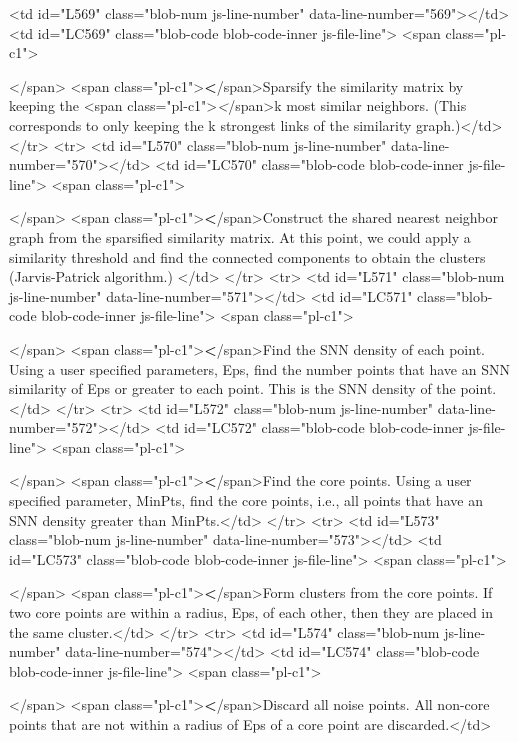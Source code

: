         <td id="L569" class="blob-num js-line-number" data-line-number="569"></td>
        <td id="LC569" class="blob-code blob-code-inner js-file-line">	<span class="pl-c1">\item</span> <span class="pl-c1">\textbf</span>{Sparsify the similarity matrix by keeping the <span class="pl-c1">\textit</span>{k} most similar neighbors.} (This corresponds to only keeping the k strongest links	of the similarity graph.)</td>
      </tr>
      <tr>
        <td id="L570" class="blob-num js-line-number" data-line-number="570"></td>
        <td id="LC570" class="blob-code blob-code-inner js-file-line">	<span class="pl-c1">\item</span> <span class="pl-c1">\textbf</span>{Construct the shared nearest neighbor graph from the sparsified similarity matrix.} At this point, we could apply a similarity threshold and find the connected components to obtain the clusters (Jarvis-Patrick algorithm.) </td>
      </tr>
      <tr>
        <td id="L571" class="blob-num js-line-number" data-line-number="571"></td>
        <td id="LC571" class="blob-code blob-code-inner js-file-line">	<span class="pl-c1">\item</span> <span class="pl-c1">\textbf</span>{Find the SNN density of each point.} Using a user specified parameters, Eps, find the number points that have an SNN similarity of Eps or greater to each point. This is the SNN density of the point. </td>
      </tr>
      <tr>
        <td id="L572" class="blob-num js-line-number" data-line-number="572"></td>
        <td id="LC572" class="blob-code blob-code-inner js-file-line">	<span class="pl-c1">\item</span> <span class="pl-c1">\textbf</span>{Find the core points.} Using a user specified parameter, MinPts, find the core points, i.e., all points that have an SNN density greater than MinPts.</td>
      </tr>
      <tr>
        <td id="L573" class="blob-num js-line-number" data-line-number="573"></td>
        <td id="LC573" class="blob-code blob-code-inner js-file-line">	<span class="pl-c1">\item</span> <span class="pl-c1">\textbf</span>{Form clusters from the core points.} If two core points are within a radius, Eps, of each other, then they are placed in the same cluster.</td>
      </tr>
      <tr>
        <td id="L574" class="blob-num js-line-number" data-line-number="574"></td>
        <td id="LC574" class="blob-code blob-code-inner js-file-line">	<span class="pl-c1">\item</span> <span class="pl-c1">\textbf</span>{Discard all noise points.} All non-core points that are not within a radius of Eps of a core point are discarded.</td>
